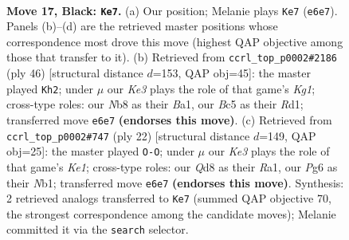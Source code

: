 \documentclass[11pt]{article}
\begin{document}
\clearpage

\begin{figure}[p]\centering
\begin{subfigure}{0.46\textwidth}\centering
\resizebox{\linewidth}{!}{%
\newchessgame
\chessboard[
  setfen={rnbq1r2/pp1n4/4k1p1/2bQ2P1/P7/2N2N2/1P3P2/R1B1KB1R b KQ - 1 17},
  showmover=false,
  pgfstyle=straightmove, color=movearrow, markmove={e6-e7}
]}
\caption{}
\end{subfigure}\hfill
\begin{subfigure}{0.46\textwidth}\centering
\resizebox{\linewidth}{!}{%
\newchessgame
\chessboard[
  setfen={1rr3k1/5ppp/R4n2/3p4/1b6/2N1q2P/2Q1N1P1/B2R2K1 w - - 0 24},
  showmover=false,
  pgfstyle=straightmove, color=movearrow, markmove={g1-h2}
]}
\caption{}
\end{subfigure}
\\[4pt]
\begin{subfigure}{0.46\textwidth}\centering
\resizebox{\linewidth}{!}{%
\newchessgame
\chessboard[
  setfen={r3kbnr/pp1b1ppp/4p3/1B2P3/1n1q4/2N5/1B1P1PPP/RN1QK2R w KQkq - 2 12},
  showmover=false,
  pgfstyle=straightmove, color=movearrow, markmove={e1-g1}
]}
\caption{}
\end{subfigure}\hfill

\caption{\textbf{Move 17, Black: \texttt{Ke7}.} (a) Our position; Melanie plays \texttt{Ke7} (\texttt{e6e7}). Panels (b)--(d) are the retrieved master positions whose correspondence most drove this move (highest QAP objective among those that transfer to it). (b) Retrieved from \texttt{ccrl\_top\_p0002\#2186} (ply 46) [structural distance $d$=153, QAP obj=45]: the master played \texttt{Kh2}; under $\mu$ our \emph{Ke3} plays the role of that game's \emph{Kg1}; cross-type roles: our \emph{N}b8 as their \emph{B}a1, our \emph{B}c5 as their \emph{R}d1; transferred move \texttt{e6e7} \textbf{(endorses this move)}. (c) Retrieved from \texttt{ccrl\_top\_p0002\#747} (ply 22) [structural distance $d$=149, QAP obj=25]: the master played \texttt{O-O}; under $\mu$ our \emph{Ke3} plays the role of that game's \emph{Ke1}; cross-type roles: our \emph{Q}d8 as their \emph{R}a1, our \emph{P}g6 as their \emph{N}b1; transferred move \texttt{e6e7} \textbf{(endorses this move)}. Synthesis: 2 retrieved analogs transferred to \texttt{Ke7} (summed QAP objective 70, the strongest correspondence among the candidate moves); Melanie committed it via the \texttt{search} selector.}
\label{fig:thought-m33}
\end{figure}

\clearpage
\end{document}
